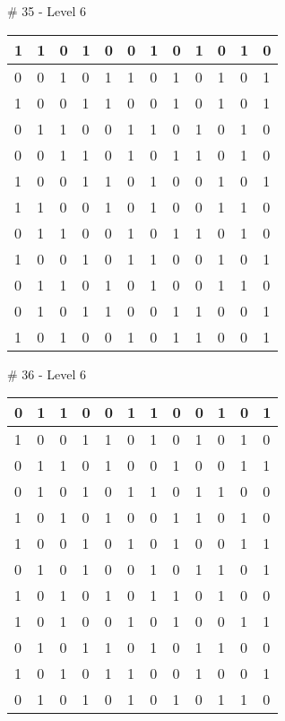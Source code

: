 \smallskip

\# 35 - Level 6 \newline
\begin{tabular}{|m{\collen}|m{\collen}|m{\collen}|m{\collen}|m{\collen}|m{\collen}|m{\collen}|m{\collen}|m{\collen}|m{\collen}|m{\collen}|m{\collen}|}
\hline
  1 & 1 & 0 & 1 & 0 & 0 & 1 & 0 & 1 & 0 & 1 & 0 \\
\hline
  0 & 0 & 1 & 0 & 1 & 1 & 0 & 1 & 0 & 1 & 0 & 1 \\
\hline
  1 & 0 & 0 & 1 & 1 & 0 & 0 & 1 & 0 & 1 & 0 & 1 \\
\hline
  0 & 1 & 1 & 0 & 0 & 1 & 1 & 0 & 1 & 0 & 1 & 0 \\
\hline
  0 & 0 & 1 & 1 & 0 & 1 & 0 & 1 & 1 & 0 & 1 & 0 \\
\hline
  1 & 0 & 0 & 1 & 1 & 0 & 1 & 0 & 0 & 1 & 0 & 1 \\
\hline
  1 & 1 & 0 & 0 & 1 & 0 & 1 & 0 & 0 & 1 & 1 & 0 \\
\hline
  0 & 1 & 1 & 0 & 0 & 1 & 0 & 1 & 1 & 0 & 1 & 0 \\
\hline
  1 & 0 & 0 & 1 & 0 & 1 & 1 & 0 & 0 & 1 & 0 & 1 \\
\hline
  0 & 1 & 1 & 0 & 1 & 0 & 1 & 0 & 0 & 1 & 1 & 0 \\
\hline
  0 & 1 & 0 & 1 & 1 & 0 & 0 & 1 & 1 & 0 & 0 & 1 \\
\hline
  1 & 0 & 1 & 0 & 0 & 1 & 0 & 1 & 1 & 0 & 0 & 1 \\
\hline
\end{tabular}


\smallskip

\# 36 - Level 6 \newline
\begin{tabular}{|m{\collen}|m{\collen}|m{\collen}|m{\collen}|m{\collen}|m{\collen}|m{\collen}|m{\collen}|m{\collen}|m{\collen}|m{\collen}|m{\collen}|}
\hline
  0 & 1 & 1 & 0 & 0 & 1 & 1 & 0 & 0 & 1 & 0 & 1 \\
\hline
  1 & 0 & 0 & 1 & 1 & 0 & 1 & 0 & 1 & 0 & 1 & 0 \\
\hline
  0 & 1 & 1 & 0 & 1 & 0 & 0 & 1 & 0 & 0 & 1 & 1 \\
\hline
  0 & 1 & 0 & 1 & 0 & 1 & 1 & 0 & 1 & 1 & 0 & 0 \\
\hline
  1 & 0 & 1 & 0 & 1 & 0 & 0 & 1 & 1 & 0 & 1 & 0 \\
\hline
  1 & 0 & 0 & 1 & 0 & 1 & 0 & 1 & 0 & 0 & 1 & 1 \\
\hline
  0 & 1 & 0 & 1 & 0 & 0 & 1 & 0 & 1 & 1 & 0 & 1 \\
\hline
  1 & 0 & 1 & 0 & 1 & 0 & 1 & 1 & 0 & 1 & 0 & 0 \\
\hline
  1 & 0 & 1 & 0 & 0 & 1 & 0 & 1 & 0 & 0 & 1 & 1 \\
\hline
  0 & 1 & 0 & 1 & 1 & 0 & 1 & 0 & 1 & 1 & 0 & 0 \\
\hline
  1 & 0 & 1 & 0 & 1 & 1 & 0 & 0 & 1 & 0 & 0 & 1 \\
\hline
  0 & 1 & 0 & 1 & 0 & 1 & 0 & 1 & 0 & 1 & 1 & 0 \\
\hline
\end{tabular}


